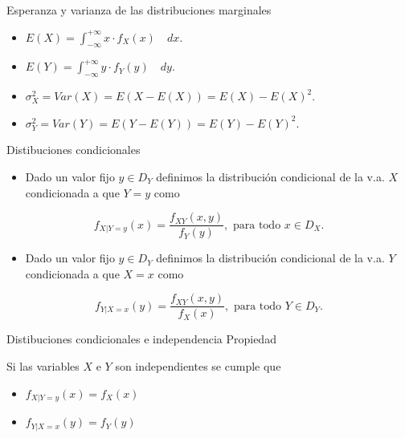 \documentclass[
  ignorenonframetext,
]{beamer}
\providecommand{\tightlist}{%
  \setlength{\itemsep}{0pt}\setlength{\parskip}{0pt}}
\begin{document}
\begin{frame}{Esperanza y varianza de las distribuciones marginales}
\protect\hypertarget{esperanza-y-varianza-de-las-distribuciones-marginales}{}
\begin{itemize}
\tightlist
\item
  \(E(X)=\int_{-\infty}^{+\infty} x\cdot f_X(x)\quad dx.\)
\item
  \(E(Y)=\int_{-\infty}^{+\infty} y\cdot f_Y(y)\quad dy.\)
\item
  \(\sigma_X^2=Var(X)=E(X-E(X))=E(X)-E(X)^2.\)
\item
  \(\sigma_Y^2=Var(Y)=E(Y-E(Y))=E(Y)-E(Y)^2.\)
\end{itemize}
\end{frame}

\begin{frame}{Distibuciones condicionales}
\protect\hypertarget{distibuciones-condicionales}{}
\begin{itemize}
\tightlist
\item
  Dado un valor fijo \(y\in D_Y\) definimos la distribución condicional
  de la v.a. \(X\) condicionada a que \(Y=y\) como
\end{itemize}

\[f_{X|Y=y}(x)=\frac{f_{XY}(x,y)}{f_Y(y)},\mbox{  para todo } x\in D_X.\]

\begin{itemize}
\tightlist
\item
  Dado un valor fijo \(y\in D_Y\) definimos la distribución condicional
  de la v.a. \(Y\) condicionada a que \(X=x\) como
\end{itemize}

\[f_{Y|X=x}(y)=\frac{f_{XY}(x,y)}{f_X(x)},\mbox{  para todo } Y\in D_Y.\]
\end{frame}

\begin{frame}{Distibuciones condicionales e independencia}
\protect\hypertarget{distibuciones-condicionales-e-independencia}{}
Propiedad

Si las variables \(X\) e \(Y\) son independientes se cumple que

\begin{itemize}
\tightlist
\item
  \(f_{X|Y=y}(x)=f_X(x)\)
\item
  \(f_{Y|X=x}(y)=f_Y(y)\)
\end{itemize}
\end{frame}
\end{document}
